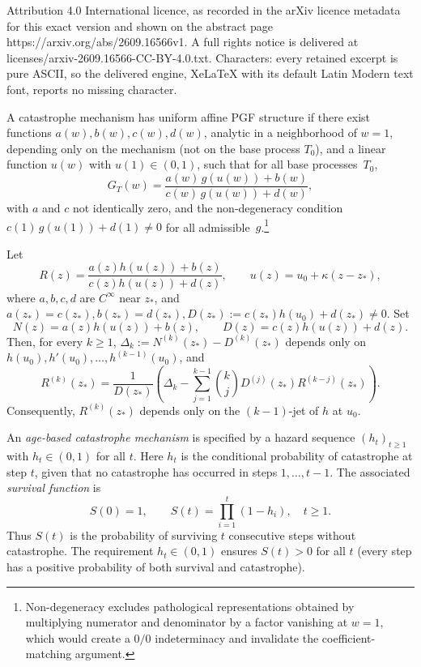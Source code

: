 \documentclass[10pt,a4paper]{amsart}
\begin{document}
Attribution 4.0 International licence, as recorded in the arXiv licence metadata for this exact version and shown on the abstract page https://arxiv.org/abs/2609.16566v1. A full rights notice is delivered at licenses/arxiv-2609.16566-CC-BY-4.0.txt. Characters: every retained excerpt is pure ASCII, so the delivered engine, XeLaTeX with its default Latin Modern text font, reports no missing character.
\begin{definition}\label{def:affine}
A catastrophe mechanism has uniform affine PGF structure if there exist functions
\(a(w),b(w),c(w),d(w)\), analytic in a neighborhood of \(w=1\), depending only on the mechanism
(not on the base process \(T_0\)), and a linear function \(u(w)\) with \(u(1)\in(0,1)\), such that for all base processes~$T_0$,
\[
  G_T(w) = \frac{a(w)\,g(u(w)) + b(w)}{c(w)\,g(u(w)) + d(w)},
\]
with $a$ and $c$ not identically zero, and the non-degeneracy condition $c(1)\,g(u(1)) + d(1) \neq 0$ for all admissible~$g$.\label{rem:nondegen}\footnote{Non-degeneracy excludes pathological representations obtained by multiplying numerator and denominator by a factor vanishing at $w = 1$, which would create a $0/0$ indeterminacy and invalidate the coefficient-matching argument.}
\end{definition}

\begin{lemma}\label{lem:affine-ratio-rec}
Let
\[
  R(z)=\frac{a(z)h(u(z))+b(z)}{c(z)h(u(z))+d(z)},
  \qquad
  u(z)=u_0+\kappa(z-z_*),
\]
where $a,b,c,d$ are $C^\infty$ near $z_*$, and $a(z_*)=c(z_*), b(z_*)=d(z_*), D(z_*):=c(z_*)h(u_0)+d(z_*)\neq 0$.
Set
\[
  N(z)=a(z)h(u(z))+b(z),\qquad D(z)=c(z)h(u(z))+d(z).
\]
Then, for every $k\ge 1$, $\Delta_k:=N^{(k)}(z_*)-D^{(k)}(z_*)$ depends only on $h(u_0),h'(u_0),\dots,h^{(k-1)}(u_0)$, and
\[
  R^{(k)}(z_*)
  =
  \frac{1}{D(z_*)}
  \left(
    \Delta_k-\sum_{j=1}^{k-1}\binom{k}{j}D^{(j)}(z_*)R^{(k-j)}(z_*)
  \right).
\]
Consequently, $R^{(k)}(z_*)$ depends only on the $(k-1)$-jet of $h$ at $u_0$.
\end{lemma}

\begin{definition}\label{def:hazard}
An \emph{age-based catastrophe mechanism} is specified by a hazard sequence $(h_t)_{t \geq 1}$ with $h_t \in (0,1)$ for all $t$.  Here $h_t$ is the conditional probability of catastrophe at step $t$, given that no catastrophe has occurred in steps $1, \ldots, t-1$.  The associated \emph{survival function} is
\begin{equation}\label{eq:survival}
  S(0) = 1, \qquad S(t) = \prod_{i=1}^{t}(1 - h_i), \quad t \geq 1.
\end{equation}
Thus $S(t)$ is the probability of surviving $t$ consecutive steps without catastrophe.  The requirement $h_t \in (0,1)$ ensures $S(t) > 0$ for all $t$ (every step has a positive probability of both survival and catastrophe).
\end{definition}
\end{document}

